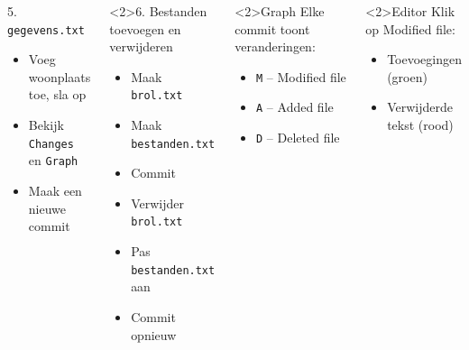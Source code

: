 \documentclass
[kulak] %
{kulakbeamer}
\begin{document}
\begin{frame}{}
		\begin{columns}[T]
			\begin{block}{5. \texttt{gegevens.txt}}
				\begin{itemize}
				\item Voeg woonplaats toe, sla op
				\item Bekijk \texttt{Changes} en \texttt{Graph}
				\item Maak een nieuwe commit
				\end{itemize}
			\end{block}

			\begin{block}<2>{6. Bestanden toevoegen en verwijderen}
				\begin{itemize}
				\item Maak \texttt{brol.txt}
				\item Maak \texttt{bestanden.txt}
				\item Commit
				\item Verwijder \texttt{brol.txt}
				\item Pas \texttt{bestanden.txt} aan
				\item Commit opnieuw
				\end{itemize}
			\end{block}
	
			\begin{exampleblock}<2>{Graph}
				Elke commit toont veranderingen:
				\begin{itemize}
					\item \texttt{M} -- Modified file
					\item \texttt{A} -- Added file
					\item \texttt{D} -- Deleted file
				\end{itemize}
			\end{exampleblock}

			\begin{exampleblock}<2>{Editor}
			Klik op Modified file:
				\begin{itemize}
				\item Toevoegingen (groen)
				\item Verwijderde tekst (rood)
				\end{itemize}
		\end{exampleblock}
		\end{columns}
	\end{frame}
\end{document}
